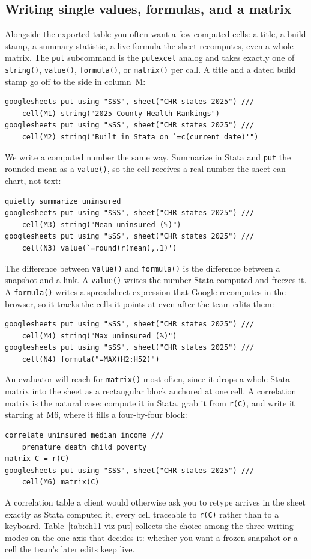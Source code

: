 \documentclass[
    a4paper,
    fontsize=10pt,
    twoside=true,
    numbers=noenddot,
]{kaobook}
\begin{document}
\subsection{Writing single values, formulas, and a matrix}
Alongside the exported table you often want a few computed cells: a title, a build stamp, a summary statistic, a live formula the sheet recomputes, even a whole matrix. The \texttt{put} subcommand is the \texttt{putexcel} analog and takes exactly one of \texttt{string()}, \texttt{value()}, \texttt{formula()}, or \texttt{matrix()} per call. A title and a dated build stamp go off to the side in column~M:
\par
{\footnotesize
\begin{verbatim}
googlesheets put using "$SS", sheet("CHR states 2025") ///
    cell(M1) string("2025 County Health Rankings")
googlesheets put using "$SS", sheet("CHR states 2025") ///
    cell(M2) string("Built in Stata on `=c(current_date)'")
\end{verbatim}
}
We write a computed number the same way. Summarize in Stata and \texttt{put} the rounded mean as a \texttt{value()}, so the cell receives a real number the sheet can chart, not text:
\par
{\footnotesize
\begin{verbatim}
quietly summarize uninsured
googlesheets put using "$SS", sheet("CHR states 2025") ///
    cell(M3) string("Mean uninsured (%)")
googlesheets put using "$SS", sheet("CHR states 2025") ///
    cell(N3) value(`=round(r(mean),.1)')
\end{verbatim}
}
The difference between \texttt{value()} and \texttt{formula()} is the difference between a snapshot and a link. A \texttt{value()} writes the number Stata computed and freezes it. A \texttt{formula()} writes a spreadsheet expression that Google recomputes in the browser, so it tracks the cells it points at even after the team edits them:
\par
{\footnotesize
\begin{verbatim}
googlesheets put using "$SS", sheet("CHR states 2025") ///
    cell(M4) string("Max uninsured (%)")
googlesheets put using "$SS", sheet("CHR states 2025") ///
    cell(N4) formula("=MAX(H2:H52)")
\end{verbatim}
}
An evaluator will reach for \texttt{matrix()} most often, since it drops a whole Stata matrix into the sheet as a rectangular block anchored at one cell. A correlation matrix is the natural case: compute it in Stata, grab it from \texttt{r(C)}, and write it starting at M6, where it fills a four-by-four block:
\par
{\footnotesize
\begin{verbatim}
correlate uninsured median_income ///
    premature_death child_poverty
matrix C = r(C)
googlesheets put using "$SS", sheet("CHR states 2025") ///
    cell(M6) matrix(C)
\end{verbatim}
}
A correlation table a client would otherwise ask you to retype arrives in the sheet exactly as Stata computed it, every cell traceable to \texttt{r(C)} rather than to a keyboard. Table~\ref{tab:ch11-viz-put} collects the choice among the three writing modes on the one axis that decides it: whether you want a frozen snapshot or a cell the team's later edits keep live.
\end{document}
